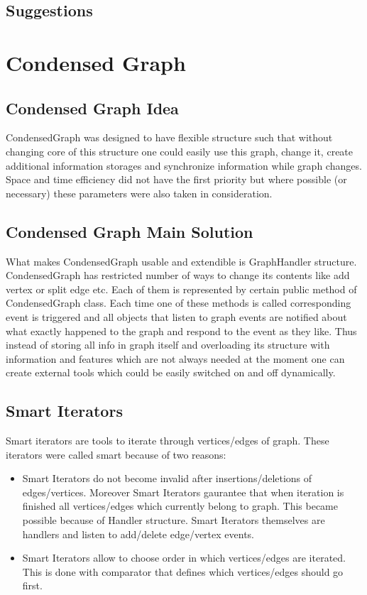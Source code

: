 \documentclass[14pt]{article}
\begin{document}
\subsection{Suggestions}

\section{Condensed Graph}
\subsection{Condensed Graph Idea}

CondensedGraph was designed to have flexible structure such that without changing core of this structure one could easily use this graph, change it, create additional information storages and synchronize information while graph changes. Space and time efficiency did not have the first priority but where possible (or necessary) these parameters were also taken in consideration.

\subsection{Condensed Graph Main Solution}

What makes CondensedGraph usable and extendible is GraphHandler structure. CondensedGraph has restricted number of ways to change its contents like add vertex or split edge etc. Each of them is represented by certain public method of CondensedGraph class. Each time one of these methods is called corresponding event is triggered and all objects that listen to graph events are notified about what exactly happened to the graph and respond to the event as they like. Thus instead of storing all info in graph itself and overloading its structure with information and features which are not always needed at the moment one can create external tools which could be easily switched on and off dynamically.

\subsection{Smart Iterators}

Smart iterators are tools to iterate through vertices/edges of graph. These iterators were called smart because of two reasons:
\begin{itemize}
\item Smart Iterators do not become invalid after insertions/deletions of edges/vertices. Moreover Smart Iterators gaurantee that when iteration is finished all vertices/edges which currently belong to graph. This became possible because of Handler structure. Smart Iterators themselves are handlers and listen to add/delete edge/vertex events.
\item Smart Iterators allow to choose order in which vertices/edges are iterated. This is done with comparator that defines which vertices/edges should go first.
\end{itemize}
\end{document}

